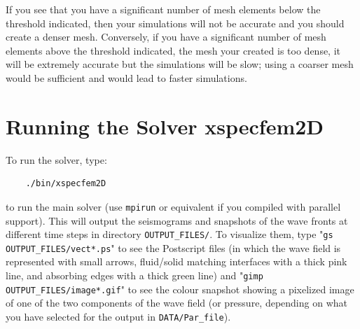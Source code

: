 \documentclass[oneside,english,onecolumn,letterpaper]{book}
\begin{document}
If you see that you have a significant number of mesh elements below the threshold indicated, then your simulations
will not be accurate and you should create a denser mesh. Conversely, if you have a significant number of mesh elements above the threshold indicated,
the mesh your created is too dense, it will be extremely accurate but the simulations will be slow; using a coarser mesh would be sufficient and would lead to faster simulations.


\chapter{Running the Solver xspecfem2D}


To run the solver, type:
%
\begin{verbatim}
    ./bin/xspecfem2D
\end{verbatim}
%
to run the main solver (use \texttt{mpirun} or equivalent if you compiled with parallel support). This will output the seismograms and snapshots of the wave fronts at different time steps in directory \texttt{OUTPUT\_FILES/}. To visualize them, type "\texttt{gs OUTPUT\_FILES/vect*.ps}" to see the Postscript files (in which the wave field is represented with small arrows, fluid/solid matching interfaces with a thick pink line, and absorbing edges with a thick green line) and "\texttt{gimp OUTPUT\_FILES/image*.gif}" to see the colour snapshot showing a pixelized image of one of the two components of the wave field (or pressure, depending on what you have selected for the output in \texttt{DATA/Par\_file}).
\end{document}
